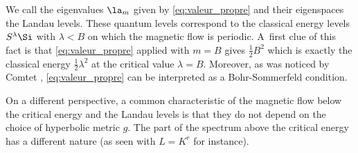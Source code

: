 We call the eigenvalues $\la_m$ given by \eqref{eq:valeur_propre} and their eigenspaces the Landau levels.
These quantum levels correspond to the classical energy
levels $S^\lambda \Si$ with $\lambda <B$ on which the magnetic flow is periodic. A~first
clue of this fact is that \eqref{eq:valeur_propre} applied with $m = B$ gives $\frac{1}{2} B^2$ which is exactly the classical
energy $\frac{1}{2} \lambda^2$ at the critical value $\lambda =B$.
Moreover, as was noticed by Comtet \cite{Comtet-86}, \eqref{eq:valeur_propre} can be interpreted as a
Bohr-Sommerfeld condition.

On a different perspective, a common characteristic
of the magnetic flow below the critical energy and the Landau levels is
that they do not depend on the choice of hyperbolic metric $g$. The part of the spectrum above the
critical energy has a different nature (as seen with $L = K^r$ for instance).

